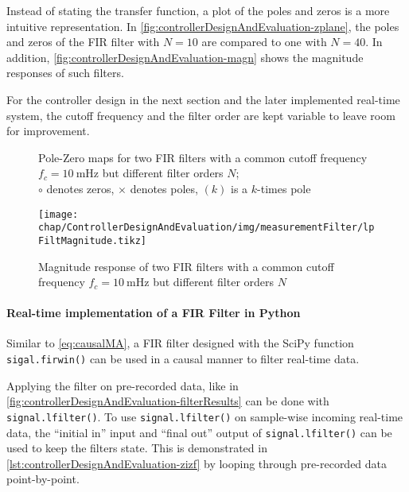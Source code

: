 Instead of stating the transfer function, a plot of the poles and zeros is a more intuitive representation. In \autoref{fig:controllerDesignAndEvaluation-zplane}, the poles and zeros of the FIR filter with $N=10$ are compared to one with $N=40$. In addition, \autoref{fig:controllerDesignAndEvaluation-magn} shows the magnitude responses of such filters.

For the controller design in the next section and the later implemented real-time system, the cutoff frequency and the filter order are kept variable to leave room for improvement.

\begin{figure}[tb]
    \centering
        \subfloat[$N=10$]{}
        \qquad
        \subfloat[$N=40$]{}
       \caption{Pole-Zero maps for two FIR filters with a common cutoff frequency $f_c=\SI{10}{\milli\hertz}$ but different filter orders $N$;\\ $\circ$ denotes zeros, $\times$ denotes poles, $(k)$ is a $k$-times pole}
    \label{fig:controllerDesignAndEvaluation-zplane}
\end{figure}

\begin{figure}[tb]
	\centering
	\texttt{[image: chap/ControllerDesignAndEvaluation/img/measurementFilter/lpFiltMagnitude.tikz]}
	\caption{Magnitude response of two FIR filters with a common cutoff frequency $f_c=\SI{10}{\milli\hertz}$ but different filter orders $N$}
	\label{fig:controllerDesignAndEvaluation-magn}
\end{figure}

\FloatBarrier
\paragraph{Real-time implementation of a FIR Filter in Python}
Similar to \autoref{eq:causalMA}, a FIR filter designed with the SciPy function \texttt{sigal.firwin()} can be used in a causal manner to filter real-time data.

Applying the filter on pre-recorded data, like in \autoref{fig:controllerDesignAndEvaluation-filterResults} can be done with \texttt{signal.lfilter()}. To use \texttt{signal.lfilter()} on sample-wise incoming real-time data, the ``initial in'' input and ``final out'' output of \texttt{signal.lfilter()} can be used to keep the filters state. This is demonstrated in \autoref{lst:controllerDesignAndEvaluation-zizf} by looping through pre-recorded data point-by-point.

